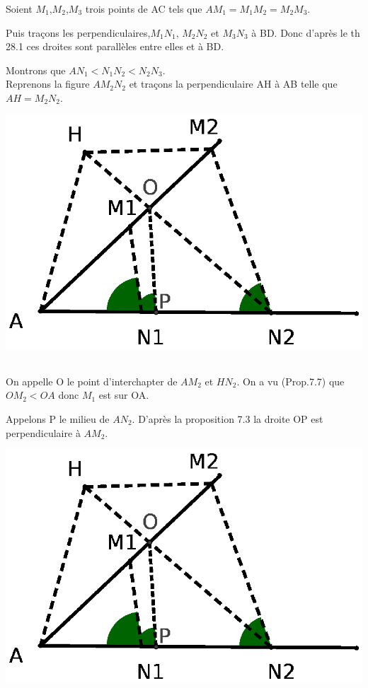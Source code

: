 \documentclass[a4paper, 12pt, twoside]{book}
\begin{document}
  
 Soient $M_{1}$,$M_{2}$,$M_{3}$ trois points de AC tels que $AM_{1}=M_{1}M_{2}=M_{2}M_{3}$.\
 
 Puis traçons les perpendiculaires,$M_{1}N_{1}$, $M_{2}N_{2}$ et $M_{3}N_{3}$ à BD. Donc d'après le th 28.1 ces droites sont parallèles entre elles et à BD.
 
 
 Montrons que $AN_{1}<N_{1}N_{2}<N_{2}N_{3}$.\\
 
 Reprenons la figure $AM_{2}N_{2}$ et traçons la perpendiculaire AH à AB telle que $AH=M_{2}N_{2}$.\
 
  \includegraphics[scale=0.6]{figures/sacc12.eps} \
 
 On appelle O le point d'interchapter de $AM_{2}$ et $HN_{2}$. On a vu (Prop.7.7) que $OM_{2}<OA$ donc $M_{1}$ est sur OA.\
 
  Appelons P le milieu de $AN_{2}$. D'après la proposition 7.3 la droite OP est perpendiculaire à $AM_{2}$.
 
 
 \includegraphics[scale=0.5]{figures/sacc12.eps} \
  
\end{document}
